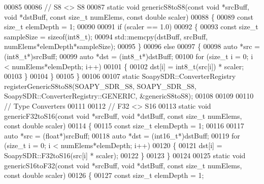 \begin{DoxyCode}
00085 
00086 \textcolor{comment}{// S8 <> S8}
00087 \textcolor{keyword}{static} \textcolor{keywordtype}{void} genericS8toS8(\textcolor{keyword}{const} \textcolor{keywordtype}{void} *srcBuff, \textcolor{keywordtype}{void} *dstBuff, \textcolor{keyword}{const} \textcolor{keywordtype}{size\_t} numElems, \textcolor{keyword}{const} \textcolor{keywordtype}{double} scaler)
00088 \{
00089   \textcolor{keyword}{const} \textcolor{keywordtype}{size\_t} elemDepth = 1;
00090 
00091   \textcolor{keywordflow}{if} (scaler == 1.0)
00092     \{
00093       \textcolor{keyword}{const} \textcolor{keywordtype}{size\_t} sampleSize = \textcolor{keyword}{sizeof}(int8\_t);
00094       std::memcpy(dstBuff, srcBuff, numElems*elemDepth*sampleSize);
00095     \}
00096   \textcolor{keywordflow}{else}
00097     \{
00098       \textcolor{keyword}{auto} *src = (int8\_t*)srcBuff;
00099       \textcolor{keyword}{auto} *dst = (int8\_t*)dstBuff;
00100       \textcolor{keywordflow}{for} (\textcolor{keywordtype}{size\_t} i = 0; i < numElems*elemDepth; i++)
00101     \{
00102       dst[i] = int8\_t(src[i]) * scaler;
00103     \}
00104     \}
00105 \}
00106 
00107 \textcolor{keyword}{static} SoapySDR::ConverterRegistry registerGenericS8toS8(SOAPY_SDR_S8, 
      SOAPY_SDR_S8, SoapySDR::ConverterRegistry::GENERIC, &genericS8toS8);
00108 
00109 
00110 \textcolor{comment}{// Type Converters}
00111 
00112 \textcolor{comment}{// F32 <> S16}
00113 \textcolor{keyword}{static} \textcolor{keywordtype}{void} genericF32toS16(\textcolor{keyword}{const} \textcolor{keywordtype}{void} *srcBuff, \textcolor{keywordtype}{void} *dstBuff, \textcolor{keyword}{const} \textcolor{keywordtype}{size\_t} numElems, \textcolor{keyword}{const} \textcolor{keywordtype}{double} scaler)
00114 \{
00115   \textcolor{keyword}{const} \textcolor{keywordtype}{size\_t} elemDepth = 1;
00116 
00117   \textcolor{keyword}{auto} *src = (\textcolor{keywordtype}{float}*)srcBuff;
00118   \textcolor{keyword}{auto} *dst = (int16\_t*)dstBuff;
00119   \textcolor{keywordflow}{for} (\textcolor{keywordtype}{size\_t} i = 0; i < numElems*elemDepth; i++)
00120     \{
00121       dst[i] = SoapySDR::F32toS16(src[i] * scaler);
00122     \}
00123 \}
00124 
00125 \textcolor{keyword}{static} \textcolor{keywordtype}{void} genericS16toF32(\textcolor{keyword}{const} \textcolor{keywordtype}{void} *srcBuff, \textcolor{keywordtype}{void} *dstBuff, \textcolor{keyword}{const} \textcolor{keywordtype}{size\_t} numElems, \textcolor{keyword}{const} \textcolor{keywordtype}{double} scaler)
00126 \{
00127   \textcolor{keyword}{const} \textcolor{keywordtype}{size\_t} elemDepth = 1;

\end{DoxyCode}
